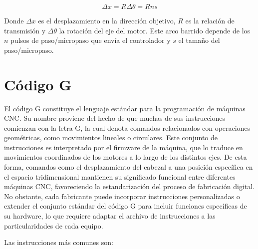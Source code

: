 \begin{equation}
    \Delta x = R\Delta \theta = R n s 
\end{equation}

Donde $\Delta x$ es el desplazamiento en la dirección objetivo, $R$ es la relación de transmisión y $\Delta \theta$ la rotación del eje del motor. Este arco barrido depende de los $n$ pulsos de paso/micropaso que envía el controlador y $s$ el tamaño del paso/micropaso.

\section{Código G}

El código G constituye el lenguaje estándar para la programación de máquinas CNC. Su nombre proviene del hecho de que muchas de sus instrucciones comienzan con la letra G, la cual denota comandos relacionados con operaciones geométricas, como movimientos lineales o circulares. Este conjunto de instrucciones es interpretado por el firmware de la máquina, que lo traduce en movimientos coordinados de los motores a lo largo de los distintos ejes. De esta forma, comandos como el desplazamiento del cabezal a una posición específica en el espacio tridimensional mantienen su significado funcional entre diferentes máquinas CNC, favoreciendo la estandarización del proceso de fabricación digital. No obstante, cada fabricante puede incorporar instrucciones personalizadas o extender el conjunto estándar del código G para incluir funciones específicas de su hardware, lo que requiere adaptar el archivo de instrucciones a las particularidades de cada equipo.

Las instrucciones más comunes son:


